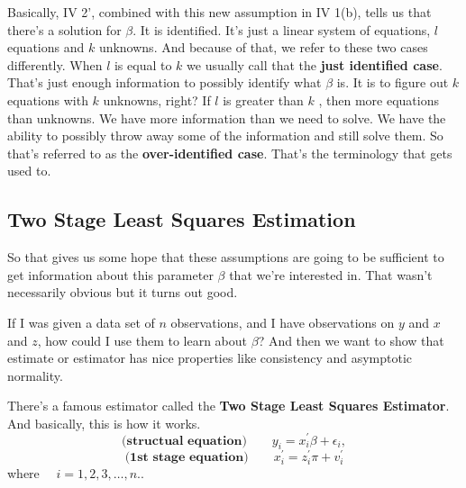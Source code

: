 \documentclass[11pt,a4paper]{amsart}
\theoremstyle{plain}
\theoremstyle{definition}
\begin{document}
	Basically, IV 2', combined with this new assumption in IV 1(b),  tells us that there's a solution for $\beta$. It is identified.  It's just a linear system of equations, $l$ equations and $k$ unknowns. And because of that, we refer to these two cases differently. When $l$ is equal to $k$ we usually call that the \textbf{just identified case}. That's just enough information to possibly identify what $\beta$ is. It is to figure out $k$ equations with $k$ unknowns, right?  If  $l$ is greater than $k$ , then more equations than unknowns. We have more information than we need to solve. We have the ability to possibly throw away some of the information and still solve them. So that's referred to as the \textbf{over-identified case}. That's the terminology that gets used to.
\subsection{Two Stage Least Squares Estimation}
	So that gives us some hope that these assumptions are going to be sufficient to get information about this parameter $\beta$ that we're interested in. That wasn't necessarily obvious but it turns out good. \par 
	If I was given a data set of $n$ observations, and I have observations on $y$ and $x$ and $z$, how could I use them to learn about $\beta$? And then we want to show that estimate or estimator has nice properties like consistency and asymptotic normality. \par 
	There's a famous estimator called the \textbf{Two Stage Least Squares Estimator}. And basically, this is how it works.
		\[ \textbf{(structual equation)} \qquad	y_{i} = x^{'}_{i} \beta + \epsilon_{i},	\]
		\begin{equation}\label{1st stage equation}
			\textbf{(1st stage equation)} \qquad x^{'}_{i} = z^{'}_{i} \pi + v^{'}_{i}
		\end{equation}
		where $ \quad i = 1,2,3, \dots,n.$.
\end{document}
